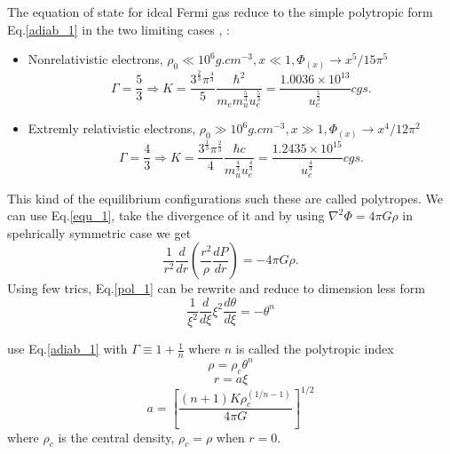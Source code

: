 \documentclass[oneside,a4paper,11pt]{report}
\begin{document}
The equation of state for ideal Fermi gas reduce to the simple polytropic form Eq.\eqref{adiab_1} in
the two limiting cases \citet{2004bhwd.book.....S}, \citet{padm_vII}:
\begin{itemize}
\item Nonrelativistic electrons, $\rho_0 \ll 10^6 g.cm^{-3}, x\ll 1, \Phi_{(x)}\rightarrow x^5/15\pi^5 $
\begin{equation}
\Gamma = \frac{5}{3} \Longrightarrow  K = \frac{3^{\frac{2}{3}}\pi^{\frac{4}{3}}}{5}\frac{\hbar^2}{m_em_u^{\frac{5}{3}}u_e^{\frac{5}{3}}} = \frac{1.0036\times 10^{13}}{u_e^{\frac{5}{3}}} cgs.
\end{equation}
\item Extremly relativistic electrons, $\rho_0 \gg 10^6 g.cm^{-3}, x\gg 1, \Phi_{(x)}\rightarrow x^4/12\pi^2 $
\begin{equation}
\Gamma = \frac{4}{3} \Longrightarrow K = \frac{3^{\frac{1}{3}}\pi^{\frac{2}{3}}}{4}\frac{\hbar c}{m_u^{\frac{4}{3}}u_e^{\frac{4}{3}}} = \frac{1.2435\times 10^{15}}{u_e^{\frac{4}{3}}} cgs.
\end{equation}
\end{itemize}

This kind of the equilibrium configurations such these are called polytropes. We can use Eq.\eqref{equ_1}, take the divergence of it and by using $\nabla^2\Phi = 4\pi G \rho$ in spehrically 
symmetric case we get  
\begin{equation}
\label{pol_1}
 \frac{1}{r^2}\frac{d}{dr}\left ( \frac{r^2}{\rho}\frac{dP}{dr} \right ) = -4\pi G\rho .
\end{equation}
Using few trics, Eq.\eqref{pol_1} can be rewrite and reduce to dimension less form 
\begin{equation}
 \label{pol_2}
\frac{1}{\xi^2 }\frac{d}{d\xi}\xi^2\frac{d\theta }{d\xi } = -\theta^n 
\end{equation}



use Eq.\eqref{adiab_1} with $\Gamma \equiv 1 + \frac{1}{n}$ where $n$ is called the polytropic index
\begin{equation}
\label{pol_3}
\rho = \rho_c \theta^n  
\end{equation}
\begin{equation}
\label{pol_4}
r = a\xi
\end{equation}
\begin{equation}
\label{pol_5} 
a = \left [ \frac{\left ( n+1 \right ) K \rho_c^{\left ( 1/n-1 \right )} }{4\pi G} \right ]^{1/2}
\end{equation}
where $\rho_c$ is the central density, $\rho_c = \rho$ when $r = 0$. 
\end{document}
